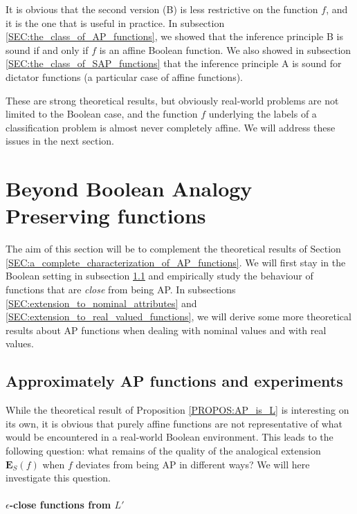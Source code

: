 It is obvious that the second version (B) is less restrictive on the function
$f$, and it is the one that is useful in practice. In subsection
\ref{SEC:the_class_of_AP_functions}, we showed that the inference principle B
is sound if and only if $f$ is an affine Boolean function. We also showed in
subsection \ref{SEC:the_class_of_SAP_functions} that the inference principle A
is sound for dictator functions (a particular case of affine functions).

These are strong theoretical results, but obviously real-world problems are not
limited to the Boolean case, and the function $f$ underlying the labels of a
classification problem is almost never completely affine. We will address these
issues in the next section.

\section{Beyond Boolean Analogy Preserving functions}
\label{SEC:beyond_boolean_AP_functions}

The aim of this section will be to complement the theoretical results of
Section \ref{SEC:a_complete_characterization_of_AP_functions}. We will first
stay in the Boolean setting in subsection \ref{SEC:approximate_ap_functions}
and empirically study the behaviour of functions that  are \textit{close} from
being AP. In subsections \ref{SEC:extension_to_nominal_attributes} and
\ref{SEC:extension_to_real_valued_functions}, we will derive some more
theoretical results about AP functions when dealing with nominal values and
with real values.

\subsection{Approximately AP functions and experiments}
\label{SEC:approximate_ap_functions}

While the theoretical result of Proposition \ref{PROPOS:AP_is_L} is interesting
on its own, it is obvious that purely affine functions are not representative
of what would be encountered in a real-world Boolean environment.  This leads to the
following question: what remains of the quality of the analogical extension
$\mathbf{E}_S(f)$ when $f$ deviates from being AP in different ways? We will
here investigate this question.

\paragraph{$\epsilon$-close functions from $L'$\\}

